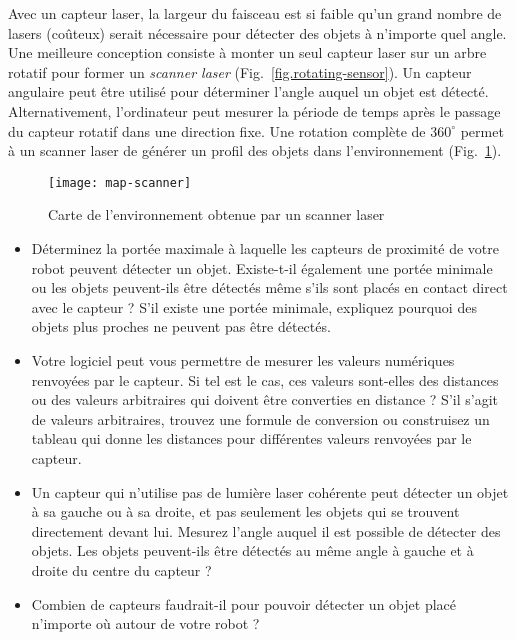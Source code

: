 Avec un capteur laser, la largeur du faisceau est si faible qu'un grand nombre de lasers (coûteux) serait nécessaire pour détecter des objets à n'importe quel angle. Une meilleure conception consiste à monter un seul capteur laser sur un arbre rotatif pour former un \emph{scanner laser} (Fig.~\ref{fig.rotating-sensor}). Un capteur angulaire peut être utilisé pour déterminer l'angle auquel un objet est détecté. Alternativement, l'ordinateur peut mesurer la période de temps après le passage du capteur rotatif dans une direction fixe. Une rotation complète de $360^\circ{}$ permet à un scanner laser de générer un profil des objets dans l'environnement (Fig.~\ref{fig.laser-scanner}).

\begin{figure}
\begin{center}
\texttt{[image: map-scanner]}
\end{center}
\caption{Carte de l'environnement obtenue par un scanner laser}\label{fig.laser-scanner}
\end{figure}

\begin{framed}

\begin{itemize}
\item Déterminez la portée maximale à laquelle les capteurs de proximité de votre robot peuvent détecter un objet. Existe-t-il également une portée minimale ou les objets peuvent-ils être détectés même s'ils sont placés en contact direct avec le capteur ? S'il existe une portée minimale, expliquez pourquoi des objets plus proches ne peuvent pas être détectés.
\item Votre logiciel peut vous permettre de mesurer les valeurs numériques renvoyées par le capteur. Si tel est le cas, ces valeurs sont-elles des distances ou des valeurs arbitraires qui doivent être converties en distance ? S'il s'agit de valeurs arbitraires, trouvez une formule de conversion ou construisez un tableau qui donne les distances pour différentes valeurs renvoyées par le capteur.
\item Un capteur qui n'utilise pas de lumière laser cohérente peut détecter un objet à sa gauche ou à sa droite, et pas seulement les objets qui se trouvent directement devant lui. Mesurez l'angle auquel il est possible de détecter des objets. Les objets peuvent-ils être détectés au même angle à gauche et à droite du centre du capteur ?
\item Combien de capteurs faudrait-il pour pouvoir détecter un objet placé n'importe où autour de votre robot ?

\end{itemize}
\end{framed}

